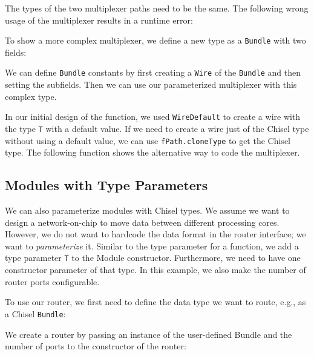 \documentclass[%
    10pt,
    headinclude, footexclude,
    openright, %
    notitlepage,
    cleardoubleempty,
    headsepline,
    pointlessnumbers,
    bibtotoc, idxtotoc,
    ]{scrbook}
\newcommand{\code}[1]{{\lstinline[basicstyle=\small\ttfamily]{#1}}}
\begin{document}

\noindent The types of the two multiplexer paths need to be the same.
The following wrong usage of the multiplexer results in a runtime error:


\noindent To show a more complex multiplexer, we define a new type as a \code{Bundle} with two fields:


\noindent We can define \code{Bundle} constants by first creating
a \code{Wire} of the \code{Bundle} and then setting the subfields.
Then we can use our parameterized multiplexer with this complex type.


In our initial design of the function, we used \code{WireDefault}
to create a wire with the type \code{T} with a default value.
If we need to create a wire just of the Chisel type without using a default
value, we can use \code{fPath.cloneType} to get the Chisel type.
The following function shows the alternative way to code the multiplexer.


\subsection{Modules with Type Parameters}

We can also parameterize modules with Chisel types.
We assume we want to design a network-on-chip to move data between
different processing cores. However, we do not want to hardcode the
data format in the router interface; we want to \emph{parameterize} it.
Similar to the type parameter for a function, we add a type parameter \code{T}
to the Module constructor. Furthermore, we need to have one constructor
parameter of that type. In this example, we also make the number
of router ports configurable.


\noindent To use our router, we first need to define the data type we want to route, e.g.,
as a Chisel \code{Bundle}:


\noindent We create a router by passing an instance of the user-defined Bundle and
the number of ports to the constructor of the router:
\end{document}
